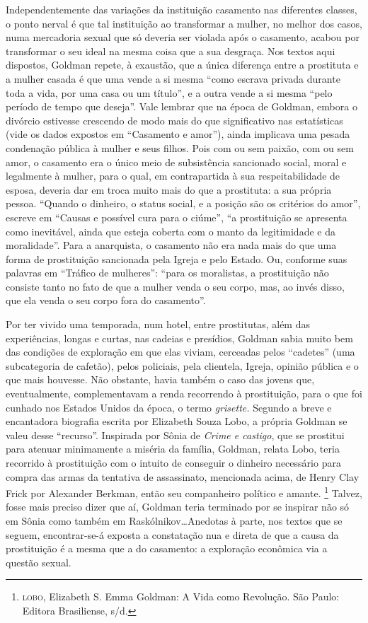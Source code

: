 Independentemente das variações da instituição casamento nas diferentes
classes, o ponto nerval é que tal instituição ao transformar a mulher,
no melhor dos casos, numa mercadoria sexual que só deveria ser violada
após o casamento, acabou por transformar o seu ideal na mesma coisa que
a sua desgraça. Nos textos aqui dispostos, Goldman repete, à exaustão,
que a única diferença entre a prostituta e a mulher casada é que uma
vende a si mesma ``como escrava privada durante toda a vida, por uma
casa ou um título'', e a outra vende a si mesma ``pelo período de tempo
que deseja''. Vale lembrar que na época de Goldman, embora o divórcio
estivesse crescendo de modo mais do que significativo nas estatísticas
(vide os dados expostos em ``Casamento e amor''), ainda implicava uma
pesada condenação pública à mulher e seus filhos. Pois com ou sem
paixão, com ou sem amor, o casamento era o único meio de subsistência
sancionado social, moral e legalmente à mulher, para o qual, em
contrapartida à sua respeitabilidade de esposa, deveria dar em troca
muito mais do que a prostituta: a sua própria pessoa. ``Quando o
dinheiro, o status social, e a posição são os critérios do amor'',
escreve em ``Causas e possível cura para o ciúme'', ``a prostituição se
apresenta como inevitável, ainda que esteja coberta com o manto da
legitimidade e da moralidade''. Para a anarquista, o casamento não era
nada mais do que uma forma de prostituição sancionada pela Igreja e pelo
Estado. Ou, conforme suas palavras em ``Tráfico de mulheres'': ``para os
moralistas, a prostituição não consiste tanto no fato de que a mulher
venda o seu corpo, mas, ao invés disso, que ela venda o seu corpo fora
do casamento''.

Por ter vivido uma temporada, num hotel, entre prostitutas, além das
experiências, longas e curtas, nas cadeias e presídios, Goldman sabia
muito bem das condições de exploração em que elas viviam, cerceadas
pelos ``cadetes'' (uma subcategoria de cafetão), pelos policiais, pela
clientela, Igreja, opinião pública e o que mais houvesse. Não obstante,
havia também o caso das jovens que, eventualmente, complementavam a
renda recorrendo à prostituição, para o que foi cunhado nos Estados
Unidos da época, o termo \emph{grisette.} Segundo a breve e encantadora
biografia escrita por Elizabeth Souza Lobo, a própria Goldman se valeu
desse ``recurso''. Inspirada por Sônia de \emph{Crime e castigo}, que se
prostitui para atenuar minimamente a miséria da família, Goldman, relata
Lobo, teria recorrido à prostituição com o intuito de conseguir o
dinheiro necessário para compra das armas da tentativa de assassinato,
mencionada acima, de Henry Clay Frick por Alexander Berkman, então seu
companheiro político e amante. \footnote{\textsc{lobo}, Elizabeth S. Emma
  Goldman: A Vida como Revolução. São Paulo: Editora Brasiliense, s/d.}
Talvez, fosse mais preciso dizer que aí, Goldman teria terminado por se
inspirar não só em Sônia como também em Raskólnikov\ldots Anedotas à parte,
nos textos que se seguem, encontrar-se-á exposta a constatação nua e
direta de que a causa da prostituição é a mesma que a do casamento: a
exploração econômica via a questão sexual.

